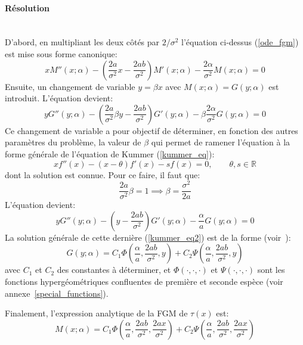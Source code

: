\paragraph{Résolution}\phantom{}\\
D'abord, en multipliant les deux côtés par $2/\sigma^2$ l'équation ci-dessus (\ref{ode_fgm}) est mise sous forme canonique: 
\[
xM''(x;\alpha)-\left(\frac{2a}{\sigma^2}x-\frac{2ab}{\sigma^2}\right)M'(x;\alpha)-\frac{2\alpha}{\sigma^2} M(x;\alpha)=0
\]
Ensuite, un changement de variable $y=\beta x$ avec $M(x;\alpha)=G(y;\alpha)$ est introduit. L'équation devient: 
\[
yG''(y;\alpha)-\left(\frac{2a}{\sigma^2} \beta y - \frac{2ab}{\sigma^2}\right)G'(y;\alpha)-\beta\frac{2\alpha}{\sigma^2} G(y;\alpha) = 0
\]
Ce changement de variable a pour objectif de déterminer, en fonction des autres paramètres du problème, la valeur de $\beta$ qui permet de ramener l'équation à la forme générale de l'équation de Kummer (\ref{kummer_eq}): 
\begin{equation}\label{kummer_eq}
    xf''(x)-(x-\theta)f'(x)-s f(x)=0,\quad\quad \theta,s\in\mathds{R}
\end{equation}
dont la solution est connue. Pour ce faire, il faut que:
\[
\frac{2a}{\sigma^2} \beta=1\implies\beta=\frac{\sigma^2}{2a}
\]
L'équation devient:
\begin{equation}\label{kummer_eq2}
    yG''(y;\alpha)-\left(y-\frac{2ab}{\sigma^2}\right)G'(y;\alpha)-\frac{\alpha}{a}G(y;\alpha) = 0
\end{equation}
La solution générale de cette dernière (\ref{kummer_eq2}) est de la forme (voir~\cite{magnus1966}): 
\[G(y;\alpha) = C_1\Phi\left(\frac{\alpha}{a}, \frac{2ab}{\sigma^2}, y\right) + C_2\Psi\left(\frac{\alpha}{a}, \frac{2ab}{\sigma^2}, y\right)\]
avec $C_1$ et $C_2$ des constantes à déterminer, et $\Phi(\cdot, \cdot, \cdot)$ et $\Psi(\cdot, \cdot, \cdot)$ sont les fonctions hypergéométriques confluentes de première et seconde espèce (voir annexe~\ref{special_functions}).

Finalement, l'expression analytique de la \acs{FGM} de $\tau(x)$ est: 
\begin{equation}\label{sol_fgm}
    M(x;\alpha) = C_1\Phi\left(\frac{\alpha}{a}, \frac{2ab}{\sigma^2}, \frac{2ax}{\sigma^2}\right) + C_2\Psi\left(\frac{\alpha}{a}, \frac{2ab}{\sigma^2}, \frac{2ax}{\sigma^2}\right)
\end{equation}

